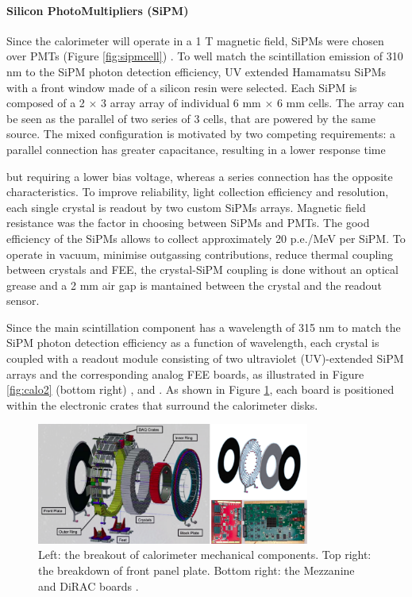 \paragraph{Silicon PhotoMultipliers (SiPM)}
Since the calorimeter will operate in a 1 T magnetic field, SiPMs were chosen over PMTs (Figure \ref{fig:sipmcell}) \cite{em1}. 
To well match the scintillation emission of 310 nm to the SiPM photon detection efficiency, 
UV extended Hamamatsu SiPMs with a front window made of a silicon resin were selected. Each SiPM is composed of a
2 $\times$ 3 array array of individual 6 mm $\times$ 6 mm cells.
The array can be seen as the parallel of two series of 3 cells, that 
are powered by the same source. The mixed configuration is motivated by 
two competing requirements: a parallel connection has {\red greater capacitance, 
  resulting in a lower response time}

but requiring a lower bias voltage, whereas 
a series connection has the opposite characteristics. 
To improve reliability, light collection efficiency and resolution, each single 
crystal is readout by two custom SiPMs arrays.
Magnetic field resistance was the factor in choosing between SiPMs and PMTs.
The good efficiency of the SiPMs allows to collect approximately 20 p.e./MeV per SiPM.
To operate in vacuum, minimise outgassing contributions, reduce 
thermal coupling between crystals and FEE, the crystal-SiPM 
coupling is done without an optical grease and a 2 mm air gap is mantained 
between the crystal and the readout sensor.

Since the main scintillation component has a wavelength of 315 nm to match the SiPM
photon detection efficiency as a function of wavelength, each crystal is coupled with a readout 
module consisting of two ultraviolet (UV)-extended SiPM arrays
and the corresponding analog FEE boards, as illustrated in Figure 
\ref{fig:calo2} (bottom right) \cite{em5}, \cite{em2} and \cite{em3}. 
As shown in Figure \ref{fig:calo3}, each board is positioned within the electronic 
crates that surround the calorimeter disks.
\begin{figure}[!h]
        \centering
        \includegraphics[width =0.8\textwidth]{figures/png/Screenshot_20240322_121017.png}
        \caption[The breakout of calorimeter mechanical components.]{Left: the breakout of calorimeter mechanical components. Top right: the breakdown of front
        panel plate. Bottom right: the Mezzanine and DiRAC boards \cite{em4}.}
        \label{fig:calo3}
        \end{figure}


